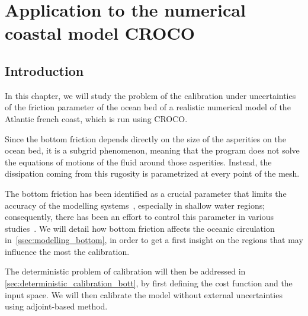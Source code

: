 \documentclass[../../Main_ManuscritThese.tex]{subfiles}
\newcommand{\CROCO}{CROCO}
\begin{document}
\chapter{Application to the numerical coastal model \CROCO}
\label{chap:croco}
\minitoc
\subfileLocal{\pagestyle{contentStyle}}

\section{Introduction}
\label{sec:intro_croco}


In this chapter, we will study the problem of the calibration under
uncertainties of the friction parameter of the ocean bed of a realistic
numerical model of the Atlantic french coast, which is run using \CROCO. 

Since the bottom friction depends directly on the size of the
asperities on the ocean bed, it is a subgrid phenomenon, meaning that
the program does not solve the equations of motions of the fluid
around those asperities. Instead, the dissipation coming from this
rugosity is parametrized at every point of the mesh.

The bottom friction has been identified as a crucial
parameter that limits the accuracy of the modelling
systems~\cite{sinha_principal_1997,kreitmair_effect_2019}, especially in shallow water
regions; consequently, there has been an effort to control this
parameter in various
studies~\cite{das_variational_1992,das_estimation_1991,boutet_estimation_2015}.
We will detail how bottom friction affects the oceanic circulation
in~\cref{ssec:modelling_bottom}, in order to get a first insight on
the regions that may influence the most the calibration.

The deterministic problem of calibration will then be addressed in
\cref{sec:deterministic_calibration_bott}, by first defining the cost
function and the input space. We will then calibrate the model
without external uncertainties using adjoint-based method.
\end{document}
